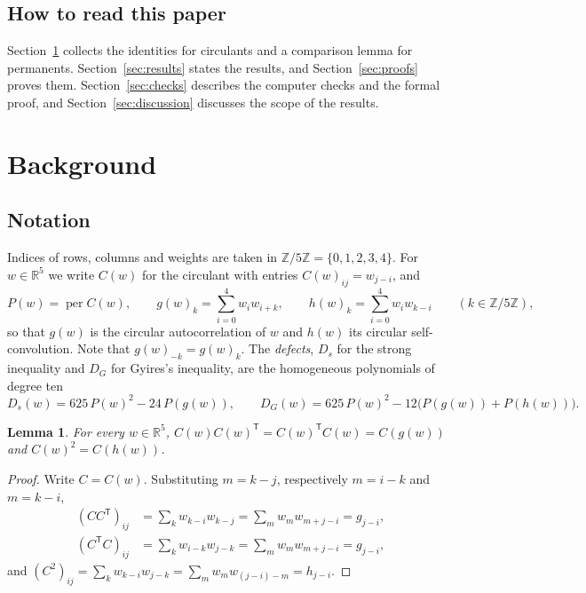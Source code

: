 \documentclass[11pt,a4paper]{article}
\newtheorem{lemma}[theorem]{Lemma}
\theoremstyle{definition}
\theoremstyle{remark}
\newcommand{\R}{\mathbb{R}}
\newcommand{\Z}{\mathbb{Z}}
\newcommand{\per}{\operatorname{per}}
\newcommand{\T}{\mathsf{T}}
\begin{document}
\subsection{How to read this paper}
Section~\ref{sec:background} collects the identities for circulants and a comparison lemma for permanents. Section~\ref{sec:results}
states the results, and Section~\ref{sec:proofs} proves them. Section~\ref{sec:checks} describes the computer checks
and the formal proof, and Section~\ref{sec:discussion} discusses the scope of the results.

\section{Background}\label{sec:background}

\subsection{Notation}
Indices of rows, columns and weights are taken in $\Z/5\Z=\{0,1,2,3,4\}$. For $w\in\R^5$ we write $C(w)$ for the
circulant with entries $C(w)_{ij}=w_{j-i}$, and
\[
P(w)=\per C(w),\qquad g(w)_k=\sum_{i=0}^4w_iw_{i+k},\qquad h(w)_k=\sum_{i=0}^4w_iw_{k-i}\qquad(k\in\Z/5\Z),
\]
so that $g(w)$ is the circular autocorrelation of $w$ and $h(w)$ its circular self-convolution. Note that
$g(w)_{-k}=g(w)_k$. The \emph{defects}, $D_s$ for the strong inequality and $D_G$ for Gyires's inequality, are the
homogeneous polynomials of degree ten
\begin{equation}\label{eq:defects}
D_s(w)=625\,P(w)^2-24\,P(g(w)),\qquad D_G(w)=625\,P(w)^2-12\bigl(P(g(w))+P(h(w))\bigr).
\end{equation}

\begin{lemma}\label{lem:products}
For every $w\in\R^5$, $C(w)C(w)^\T=C(w)^\T C(w)=C(g(w))$ and $C(w)^2=C(h(w))$.
\end{lemma}

\begin{proof}
Write $C=C(w)$. Substituting $m=k-j$, respectively $m=i-k$ and $m=k-i$,
\begin{align*}
(CC^\T)_{ij}&=\sum_kw_{k-i}w_{k-j}=\sum_mw_mw_{m+j-i}=g_{j-i},\\
(C^\T C)_{ij}&=\sum_kw_{i-k}w_{j-k}=\sum_mw_mw_{m+j-i}=g_{j-i},
\end{align*}
and $(C^2)_{ij}=\sum_kw_{k-i}w_{j-k}=\sum_mw_mw_{(j-i)-m}=h_{j-i}$.
\end{proof}
\end{document}
